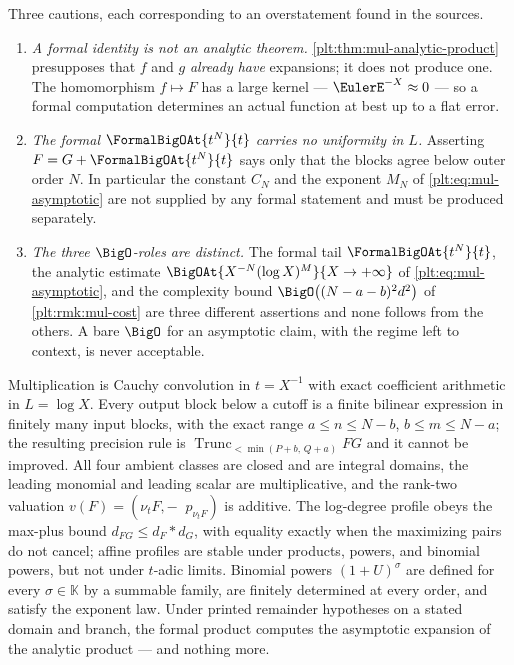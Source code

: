 \documentclass[11pt,oneside]{article}
\theoremstyle{plain}
\theoremstyle{definition}
\theoremstyle{remark}
\newcommand{\K}{\mathbb{K}}
\newcommand{\ordt}{\nu_{t}}                              %
\DeclareMathOperator{\degL}{deg_{L}}
\newcommand{\Trunc}[2]{\operatorname{Trunc}_{<#2}#1}     %
\newcommand{\dprofile}[1]{d_{#1}}                        %
\begin{document}
\begin{warningbox}
Three cautions, each corresponding to an overstatement found in the sources.
\begin{enumerate}
\item \emph{A formal identity is not an analytic theorem.}
\cref{plt:thm:mul-analytic-product} presupposes that $f$ and $g$
\emph{already have} expansions; it does not produce one.  The
homomorphism $f\mapsto F$ has a large kernel --- $\EulerE^{-X}\approx0$ ---
so a formal computation determines an actual function at best up to a flat
error.
\item \emph{The formal $\FormalBigOAt{t^N}{t}$ carries no uniformity in $L$.}
Asserting $F=G+\FormalBigOAt{t^N}{t}$ says only that the blocks agree below
outer order $N$.  In particular the constant $C_N$ and the exponent $M_N$ of
\eqref{plt:eq:mul-asymptotic} are not supplied by any formal statement and
must be produced separately.
\item \emph{The three $\BigO$-roles are distinct.}  The formal tail
$\FormalBigOAt{t^N}{t}$, the analytic estimate
$\BigOAt{X^{-N}(\log X)^{M}}{X\to+\infty}$ of
\eqref{plt:eq:mul-asymptotic}, and the complexity bound
$\BigO\bigl((N-a-b)^2d^2\bigr)$ of \cref{plt:rmk:mul-cost} are three
different assertions and none follows from the others.  A bare $\BigO$ for an
asymptotic claim, with the regime left to context, is never acceptable.
\end{enumerate}
\end{warningbox}

\begin{summarybox}
Multiplication is Cauchy convolution in $t=X^{-1}$ with exact coefficient
arithmetic in $L=\log X$.  Every output block below a cutoff is a finite
bilinear expression in finitely many input blocks, with the exact range
$a\le n\le N-b$, $b\le m\le N-a$; the resulting precision rule is
$\Trunc{FG}{\min(P+b,\,Q+a)}$ and it cannot be improved.  All four ambient
classes are closed and are integral domains, the leading monomial and leading
scalar are multiplicative, and the rank-two valuation
$v(F)=(\ordt F,-\degL p_{\ordt F})$ is additive.  The log-degree profile
obeys the max-plus bound $\dprofile{FG}\le\dprofile{F}\ast\dprofile{G}$,
with equality exactly when the maximizing pairs do not cancel; affine
profiles are stable under products, powers, and binomial powers, but not
under $t$-adic limits.  Binomial powers $(1+U)^\sigma$ are defined for every
$\sigma\in\K$ by a summable family, are finitely determined at every order,
and satisfy the exponent law.  Under printed remainder hypotheses on a stated
domain and branch, the formal product computes the asymptotic expansion of
the analytic product --- and nothing more.
\end{summarybox}
\end{document}
